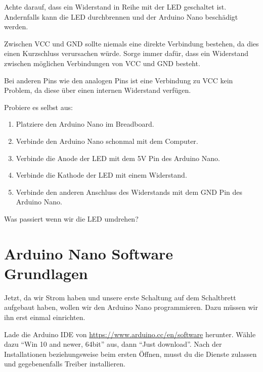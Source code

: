\documentclass[a4paper,12pt]{book}
\begin{document}
\begin{warning}
  Achte darauf, dass ein Widerstand in Reihe mit der LED geschaltet ist.
  Andernfalls kann die LED durchbrennen und der Arduino Nano beschädigt werden.

  Zwischen VCC und GND sollte niemals eine direkte Verbindung bestehen, da dies einen Kurzschluss verursachen würde.
  Sorge immer dafür, dass ein Widerstand zwischen möglichen Verbindungen von VCC und GND besteht.

  Bei anderen Pins wie den analogen Pins ist eine Verbindung zu VCC kein Problem, da diese über einen internen Widerstand verfügen.
\end{warning}

\begin{instruction}
  Probiere es selbst aus:
  \begin{enumerate}
    \item Platziere den Arduino Nano im Breadboard.
    \item Verbinde den Arduino Nano schonmal mit dem Computer.
    \item Verbinde die Anode der LED mit dem 5V Pin des Arduino Nano.
    \item Verbinde die Kathode der LED mit einem Widerstand.
    \item Verbinde den anderen Anschluss des Widerstands mit dem GND Pin des Arduino Nano.
  \end{enumerate}

  Was passiert wenn wir die LED umdrehen?
\end{instruction}




\section*{Arduino Nano Software Grundlagen}

Jetzt, da wir Strom haben und unsere erste Schaltung auf dem Schaltbrett aufgebaut haben, wollen wir den Arduino Nano programmieren.
Dazu müssen wir ihn erst einmal einrichten.

Lade die Arduino IDE von \url{https://www.arduino.cc/en/software} herunter.
Wähle dazu \enquote{Win 10 and newer, 64bit} aus, dann \enquote{Just download}.
Nach der Installationen beziehungsweise beim ersten Öffnen, musst du die Dienste
zulassen und gegebenenfalls Treiber installieren.
\end{document}
